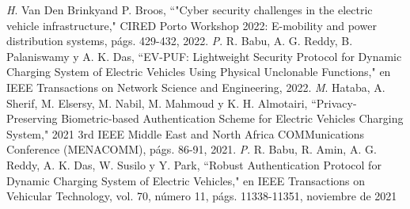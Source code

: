 \documentclass[12pt,a4paper,onecolumn,oneside]{report}
\begin{document}
\begin{thebibliography}{1}
 \textit H. Van Den Brinkyand P. Broos, ``"Cyber security challenges in the electric vehicle infrastructure," CIRED Porto Workshop 2022: E-mobility and power distribution systems, págs. 429-432, 2022.
 \textit P. R. Babu, A. G. Reddy, B. Palaniswamy y A. K. Das, ``EV-PUF: Lightweight Security Protocol for Dynamic Charging System of Electric Vehicles Using Physical Unclonable Functions," en IEEE Transactions on Network Science and Engineering, 2022.
 \textit M. Hataba, A. Sherif, M. Elsersy, M. Nabil, M. Mahmoud y K. H. Almotairi, ``Privacy-Preserving Biometric-based Authentication Scheme for Electric Vehicles Charging System," 2021 3rd IEEE Middle East and North Africa COMMunications Conference (MENACOMM), págs. 86-91, 2021.
 \textit P. R. Babu, R. Amin, A. G. Reddy, A. K. Das, W. Susilo y Y. Park, ``Robust Authentication Protocol for Dynamic Charging System of Electric Vehicles," en IEEE Transactions on Vehicular Technology, vol. 70, número 11, págs. 11338-11351, noviembre de 2021




\end{thebibliography}
\end{document}
